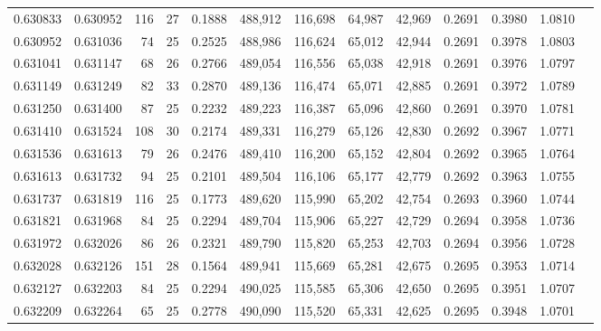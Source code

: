 \begin{tabular}{rrrrrrrrrrrrr}
0.630833 & 0.630952 &   116 &  27 &                                     0.1888 & 488,912 & 116,698 &  64,987 &  42,969 & 0.2691 & 0.3980 & 1.0810 \\
0.630952 & 0.631036 &    74 &  25 &                                     0.2525 & 488,986 & 116,624 &  65,012 &  42,944 & 0.2691 & 0.3978 & 1.0803 \\
0.631041 & 0.631147 &    68 &  26 &                                     0.2766 & 489,054 & 116,556 &  65,038 &  42,918 & 0.2691 & 0.3976 & 1.0797 \\
0.631149 & 0.631249 &    82 &  33 &                                     0.2870 & 489,136 & 116,474 &  65,071 &  42,885 & 0.2691 & 0.3972 & 1.0789 \\
0.631250 & 0.631400 &    87 &  25 &                                     0.2232 & 489,223 & 116,387 &  65,096 &  42,860 & 0.2691 & 0.3970 & 1.0781 \\
0.631410 & 0.631524 &   108 &  30 &                                     0.2174 & 489,331 & 116,279 &  65,126 &  42,830 & 0.2692 & 0.3967 & 1.0771 \\
0.631536 & 0.631613 &    79 &  26 &                                     0.2476 & 489,410 & 116,200 &  65,152 &  42,804 & 0.2692 & 0.3965 & 1.0764 \\
0.631613 & 0.631732 &    94 &  25 &                                     0.2101 & 489,504 & 116,106 &  65,177 &  42,779 & 0.2692 & 0.3963 & 1.0755 \\
0.631737 & 0.631819 &   116 &  25 &                                     0.1773 & 489,620 & 115,990 &  65,202 &  42,754 & 0.2693 & 0.3960 & 1.0744 \\
0.631821 & 0.631968 &    84 &  25 &                                     0.2294 & 489,704 & 115,906 &  65,227 &  42,729 & 0.2694 & 0.3958 & 1.0736 \\
0.631972 & 0.632026 &    86 &  26 &                                     0.2321 & 489,790 & 115,820 &  65,253 &  42,703 & 0.2694 & 0.3956 & 1.0728 \\
0.632028 & 0.632126 &   151 &  28 &                                     0.1564 & 489,941 & 115,669 &  65,281 &  42,675 & 0.2695 & 0.3953 & 1.0714 \\
0.632127 & 0.632203 &    84 &  25 &                                     0.2294 & 490,025 & 115,585 &  65,306 &  42,650 & 0.2695 & 0.3951 & 1.0707 \\
0.632209 & 0.632264 &    65 &  25 &                                     0.2778 & 490,090 & 115,520 &  65,331 &  42,625 & 0.2695 & 0.3948 & 1.0701 \\

\end{tabular}
